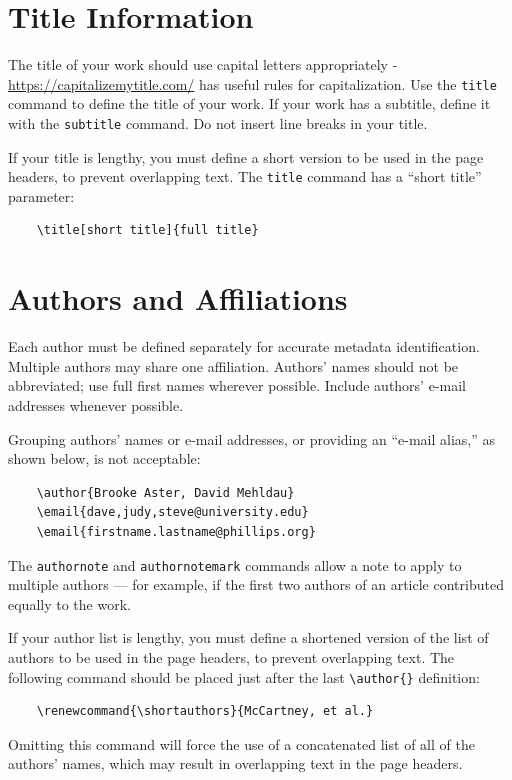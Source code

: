 \documentclass[sigconf]{acmart}
\begin{document}
	\section{Title Information}
	
	The title of your work should use capital letters appropriately - \url{https://capitalizemytitle.com/} has useful rules for capitalization. Use the {\verb|title|} command to define the title of your work. If your work has a subtitle, define it with the {\verb|subtitle|} command.
	Do not insert line breaks in your title.
	
	If your title is lengthy, you must define a short version to be used in the page headers, to prevent overlapping text. The \verb|title| command has a ``short title'' parameter:
	\begin{verbatim}
	\title[short title]{full title}
	\end{verbatim}
	
	\section{Authors and Affiliations}
	
	Each author must be defined separately for accurate metadata identification. Multiple authors may share one affiliation. Authors' names should not be abbreviated; use full first names wherever possible. Include authors' e-mail addresses whenever possible.
	
	Grouping authors' names or e-mail addresses, or providing an ``e-mail alias,'' as shown below, is not acceptable:
	\begin{verbatim}
	\author{Brooke Aster, David Mehldau}
	\email{dave,judy,steve@university.edu}
	\email{firstname.lastname@phillips.org}
	\end{verbatim}
	
	The \verb|authornote| and \verb|authornotemark| commands allow a note to apply to multiple authors --- for example, if the first two authors of an article contributed equally to the work. 
	
	If your author list is lengthy, you must define a shortened version of the list of authors to be used in the page headers, to prevent overlapping text. The following command should be placed just after the last \verb|\author{}| definition:
	\begin{verbatim}
	\renewcommand{\shortauthors}{McCartney, et al.}
	\end{verbatim}
	Omitting this command will force the use of a concatenated list of all of the authors' names, which may result in overlapping text in the page headers.
	
\end{document}
